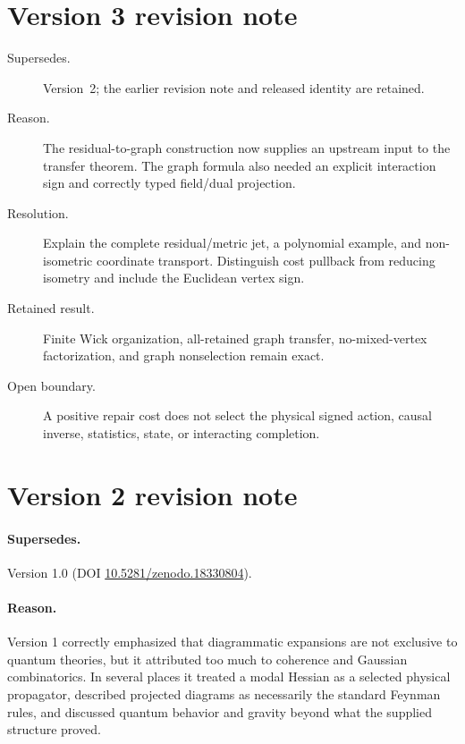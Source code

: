 \documentclass[11pt,a4paper]{article}
\begin{document}
\section*{Version 3 revision note}
\begin{description}
\item[Supersedes.] Version~2; the earlier revision note and released identity
are retained.
\item[Reason.] The residual-to-graph construction now supplies an upstream
input to the transfer theorem. The graph formula also needed an explicit
interaction sign and correctly typed field/dual projection.
\item[Resolution.] Explain the complete residual/metric jet, a polynomial
example, and non-isometric coordinate transport. Distinguish cost pullback
from reducing isometry and include the Euclidean vertex sign.
\item[Retained result.] Finite Wick organization, all-retained graph
transfer, no-mixed-vertex factorization, and graph nonselection remain exact.
\item[Open boundary.] A positive repair cost does not select the physical
signed action, causal inverse, statistics, state, or interacting completion.
\end{description}

\section*{Version 2 revision note}

\paragraph{Supersedes.} Version 1.0 (DOI
\href{https://doi.org/10.5281/zenodo.18330804}{10.5281/zenodo.18330804}).

\paragraph{Reason.} Version 1 correctly emphasized that diagrammatic expansions are not
exclusive to quantum theories, but it attributed too much to coherence and
Gaussian combinatorics.  In several places it treated a modal Hessian as a
selected physical propagator, described projected diagrams as necessarily
the standard Feynman rules, and discussed quantum behavior and gravity
beyond what the supplied structure proved.
\end{document}
